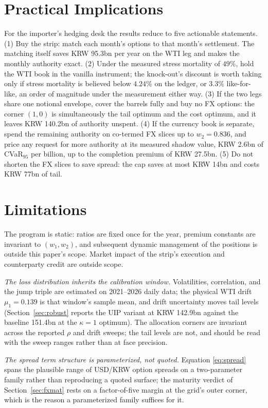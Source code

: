\documentclass[11pt,a4paper]{article}
\begin{document}
\section{Practical Implications}
\label{sec:practical}

For the importer's hedging desk the results reduce to five actionable statements. (1) Buy the strip: match each month's options to that month's settlement. The matching itself saves KRW 95.3bn per year on the WTI leg and makes the monthly authority exact. (2) Under the measured stress mortality of $49\%$, hold the WTI book in the vanilla instrument; the knock-out's discount is worth taking only if stress mortality is believed below $4.24\%$ on the ledger, or $3.3\%$ like-for-like, an order of magnitude under the measurement either way. (3) If the two legs share one notional envelope, cover the barrels fully and buy no FX options: the corner $(1,0)$ is simultaneously the tail optimum and the cost optimum, and it leaves KRW 140.2bn of authority unspent. (4) If the currency book is separate, spend the remaining authority on co-termed FX slices up to $w_2=0.836$, and price any request for more authority at its measured shadow value, KRW 2.6bn of CVaR$_{95}$ per billion, up to the completion premium of KRW 27.5bn. (5) Do not shorten the FX slices to save spread: the cap saves at most KRW 14bn and costs KRW 77bn of tail.

\section{Limitations}
\label{sec:limitations}

The program is static: ratios are fixed once for the year, premium constants are invariant to $(w_1,w_2)$, and subsequent dynamic management of the positions is outside this paper's scope. Market impact of the strip's execution and counterparty credit are outside scope.

\emph{The loss distribution inherits the calibration window.} Volatilities, correlation, and the jump triple are estimated on 2021--2026 daily data; the physical WTI drift $\mu_1=0.139$ is that window's sample mean, and drift uncertainty moves tail levels (Section~\ref{sec:robust} reports the UIP variant at KRW 142.9bn against the baseline 151.4bn at the $\kappa=1$ optimum). The allocation corners are invariant across the reported $\rho$ and drift sweeps; the tail levels are not, and should be read with the sweep ranges rather than at face precision.

\emph{The spread term structure is parameterized, not quoted.} Equation \eqref{eq:spread} spans the plausible range of USD/KRW option spreads on a two-parameter family rather than reproducing a quoted surface; the maturity verdict of Section~\ref{sec:fxmat} rests on a factor-of-five margin at the grid's outer corner, which is the reason a parameterized family suffices for it.
\end{document}
